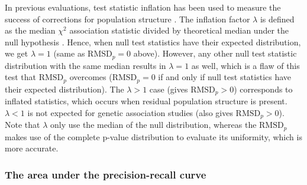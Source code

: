 \documentclass[11pt]{article}
\newcommand{\rmsd}{\text{RMSD}_p}
\begin{document}
In previous evaluations, test statistic inflation has been used to measure the success of corrections for population structure \citep{astle_population_2009, price_new_2010}.
The inflation factor $\lambda$ is defined as the median $\chi^2$ association statistic divided by theoretical median under the null hypothesis \citep{devlin_genomic_1999}.
Hence, when null test statistics have their expected distribution, we get $\lambda = 1$ (same as $\rmsd = 0$ above).
However, any other null test statistic distribution with the same median results in $\lambda = 1$ as well, which is a flaw of this test that $\rmsd$ overcomes ($\rmsd = 0$ if and only if null test statistics have their expected distribution).
The $\lambda > 1$ case (gives $\rmsd > 0$) corresponds to inflated statistics, which occurs when residual population structure is present.
$\lambda < 1$ is not expected for genetic association studies (also gives $\rmsd > 0$).
Note that $\lambda$ only use the median of the null distribution, whereas the $\rmsd$ makes use of the complete p-value distribution to evaluate its uniformity, which is more accurate.

\subsubsection{The area under the precision-recall curve}
\end{document}
